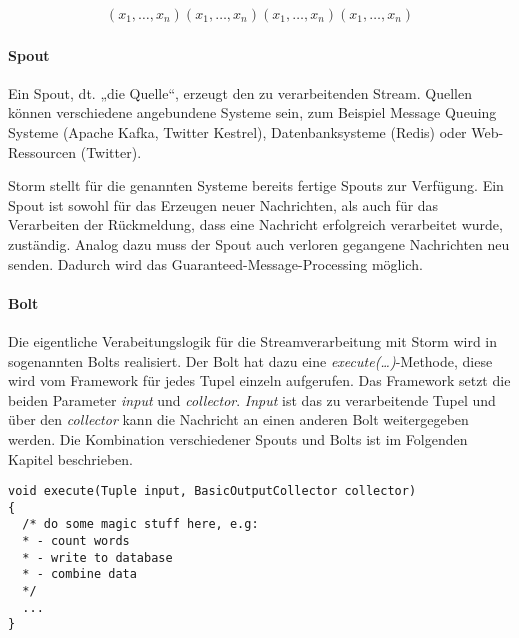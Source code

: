 \documentclass[a4paper,11pt]{scrartcl}
\begin{document}
  \begin{align*}
    (x_1, \ldots , x_n)
    (x_1, \ldots , x_n)
    (x_1, \ldots , x_n)
    (x_1, \ldots , x_n)
  \end{align*}
  \begin{figure}[!h]
    \centering
    \vspace*{-1cm}
  \end{figure}

  \paragraph{Spout}
  Ein Spout, dt. „die Quelle“, erzeugt den zu verarbeitenden Stream.
  Quellen können verschiedene angebundene Systeme sein, zum
  Beispiel Message Queuing Systeme (Apache Kafka, Twitter Kestrel),
  Datenbanksysteme (Redis) oder Web-Ressourcen (Twitter).

  Storm stellt für die genannten Systeme bereits fertige Spouts zur
  Verfügung. Ein Spout ist sowohl für das Erzeugen neuer Nachrichten,
  als auch für das Verarbeiten der Rückmeldung, dass eine Nachricht
  erfolgreich verarbeitet wurde, zuständig. Analog dazu muss der Spout
  auch verloren gegangene Nachrichten neu senden. Dadurch wird das
  Guaranteed-Message-Processing möglich.


  \paragraph{Bolt}
  Die eigentliche Verabeitungslogik für die Streamverarbeitung mit
  Storm wird in sogenannten Bolts realisiert. Der Bolt hat dazu eine
  \textit{execute(\ldots)}-Methode, diese wird vom Framework für jedes
  Tupel einzeln aufgerufen. Das Framework setzt die beiden Parameter
  \textit{input} und \textit{collector}. \textit{Input} ist das zu
  verarbeitende Tupel und über den \textit{collector} kann die
  Nachricht an einen anderen Bolt weitergegeben werden. Die
  Kombination verschiedener Spouts und Bolts ist im Folgenden Kapitel
  beschrieben.

  \begin{lstlisting}[caption={Methodensignatur einer Bolt-Implementierung}]
void execute(Tuple input, BasicOutputCollector collector)
{
  /* do some magic stuff here, e.g:
  * - count words
  * - write to database
  * - combine data
  */
  ...
}
  \end{lstlisting}
\end{document}
